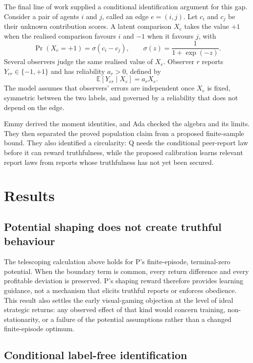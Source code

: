 \documentclass{article}
\begin{document}
The final line of work supplied a conditional identification argument for this gap.  Consider a pair of agents $i$ and $j$, called an edge $e=(i,j)$.  Let $c_i$ and $c_j$ be their unknown contribution scores.  A latent comparison $X_e$ takes the value $+1$ when the realised comparison favours $i$ and $-1$ when it favours $j$, with
\begin{equation}
\Pr(X_e=+1)=\sigma(c_i-c_j),
\qquad
\sigma(z)=\frac{1}{1+\exp(-z)}.
\end{equation}
Several observers judge the same realised value of $X_e$.  Observer $r$ reports $Y_{er}\in\{-1,+1\}$ and has reliability $a_r>0$, defined by
\begin{equation}
\mathbb{E}[Y_{er}\mid X_e]=a_rX_e.
\end{equation}
The model assumes that observers' errors are independent once $X_e$ is fixed, symmetric between the two labels, and governed by a reliability that does not depend on the edge.

Emmy derived the moment identities, and Ada checked the algebra and its limits.  They then separated the proved population claim from a proposed finite-sample bound.  They also identified a circularity: Q needs the conditional peer-report law before it can reward truthfulness, while the proposed calibration learns relevant report laws from reports whose truthfulness has not yet been secured.

\section{Results}

\subsection{Potential shaping does not create truthful behaviour}

The telescoping calculation above holds for P's finite-episode, terminal-zero potential.  When the boundary term is common, every return difference and every profitable deviation is preserved.  P's shaping reward therefore provides learning guidance, not a mechanism that elicits truthful reports or enforces obedience.  This result also settles the early visual-gaming objection at the level of ideal strategic returns: any observed effect of that kind would concern training, non-stationarity, or a failure of the potential assumptions rather than a changed finite-episode optimum.

\subsection{Conditional label-free identification}
\end{document}
